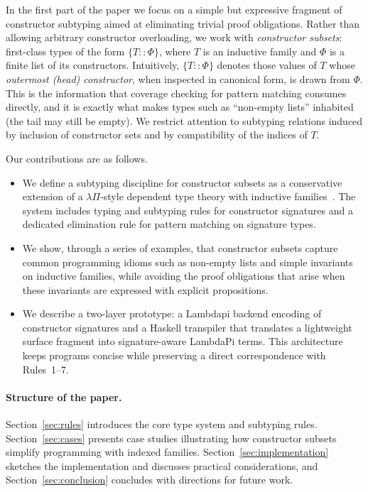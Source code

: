 \documentclass[a4paper, anonymous, UKenglish,cleveref, autoref, thm-restate]{lipics-v2021}
\begin{document}
In the first part of the paper we focus on a simple but expressive fragment of constructor subtyping aimed at eliminating trivial proof obligations. 
Rather than allowing arbitrary constructor overloading, we work with \emph{constructor subsets}: first-class types of the form $\{T :: \Phi\}$, where $T$ is an inductive family and $\Phi$ is a finite list of its constructors. Intuitively, $\{T :: \Phi\}$ denotes those values of $T$ whose \emph{outermost (head) constructor}, when inspected in canonical form, is drawn from $\Phi$. This is the information that coverage checking for pattern matching consumes directly, and it is exactly what makes types such as ``non-empty lists'' inhabited (the tail may still be empty). We restrict attention to subtyping relations induced by inclusion of constructor sets and by compatibility of the indices of $T$.

Our contributions are as follows.
\begin{itemize}
\item We define a subtyping discipline for constructor subsets as a conservative extension of a $\lambda\Pi$-style dependent type theory with inductive families~\cite{dagand2012elaborating}. The system includes typing and subtyping rules for constructor signatures and a dedicated elimination rule for pattern matching on signature types.
\item We show, through a series of examples, that constructor subsets capture common programming idioms such as non-empty lists and simple invariants on inductive families, while avoiding the proof obligations that arise when these invariants are expressed with explicit propositions.
\item We describe a two-layer prototype: a Lambdapi backend encoding of constructor signatures and a Haskell transpiler that translates a lightweight surface fragment into signature-aware LambdaPi terms. This architecture keeps programs concise while preserving a direct correspondence with Rules~1--7.
\end{itemize}

\paragraph*{Structure of the paper.}
Section~\ref{sec:rules} introduces the core type system and subtyping rules. Section~\ref{sec:cases} presents case studies illustrating how constructor subsets simplify programming with indexed families. Section~\ref{sec:implementation} sketches the implementation and discusses practical considerations, and Section~\ref{sec:conclusion} concludes with directions for future work.
\end{document}
